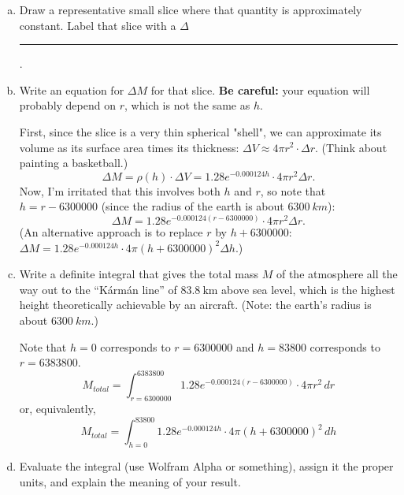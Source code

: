 \documentclass[12pt]{article}
\newenvironment{red}{\color{red}}{\ignorespacesafterend}
\begin{document}
\begin{enumerate}
\begin{enumerate}[(a)]
    \begin{red}
        The issue is that density is a nonconstant function of height, $\rho(h)$.
    \end{red}
    \item Draw a representative small slice where that quantity is approximately constant. Label that slice with a \(\Delta\)\rule{0.5cm}{0.15mm}.
    \item Write an equation for \(\Delta M\) for that slice. \textbf{Be careful:} your equation will probably depend on \(r\), which is not the same as \(h\).

    \begin{red}
        First, since the slice is a very thin spherical "shell", we can approximate its volume as its surface area times its thickness: $\Delta V \approx 4\pi r^2\cdot \Delta r$. (Think about painting a basketball.)
        \[\Delta M = \rho(h) \cdot \Delta V = 1.28 e^{-0.000124 h} \cdot 4\pi r^2 \Delta r.\]
        Now, I'm irritated that this involves both $h$ and $r$, so note that $h = r - 6300000$ (since the radius of the earth is about $\SI{6300}{km}$):
        \[\Delta M = 1.28 e^{-0.000124 (r - 6300000)} \cdot 4\pi r^2\Delta r.\]
        (An alternative approach is to replace $r$ by $h + 6300000$: \\ 
        $\Delta M = 1.28 e^{-0.000124 h} \cdot 4\pi (h+6300000)^2 \Delta h.$)
    \end{red}
    \item Write a definite integral that gives the total mass \(M\) of the atmosphere all the way out to the ``Kármán line'' of \(\qty{83.8}{\km}\) above sea level, which is the highest height theoretically achievable by an aircraft. (Note: the earth's radius is about \(\qty{6300}{km}\).)

    \begin{red}
        Note that $h = 0$ corresponds to $r = 6300000$ and $h = 83800$ corresponds to $r = 6383800$.
    \[M_{total} = \int_{r=6300000}^{6383800} 1.28 e^{-0.000124 (r - 6300000)} \cdot 4\pi r^2\,dr\] or, equivalently,
    \[M_{total} = \int_{h=0}^{83800} 1.28 e^{-0.000124 h} \cdot 4\pi (h+6300000)^2\, dh \]
    \end{red}
    \item Evaluate the integral (use Wolfram Alpha or something), assign it the proper units, and explain the meaning of your result.


\end{enumerate}
\end{enumerate}
\end{document}
